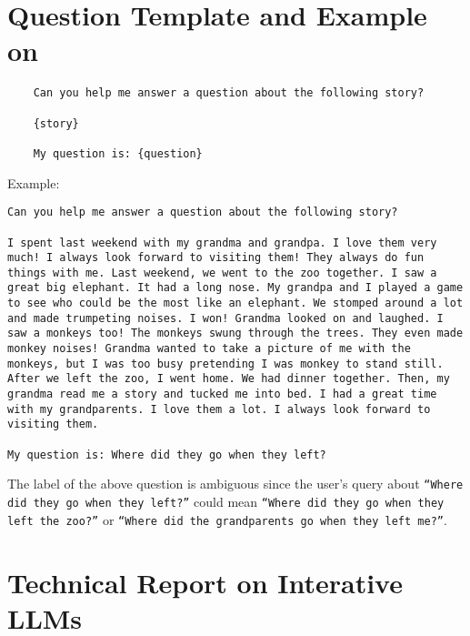 \section{Question Template and Example on \ambcoqa}
\label{app:abg_coqa}
\begin{lstlisting}
    Can you help me answer a question about the following story?
    
    {story}
    
    My question is: {question}
\end{lstlisting}

Example: 
\begin{lstlisting}
Can you help me answer a question about the following story?

I spent last weekend with my grandma and grandpa. I love them very much! I always look forward to visiting them! They always do fun things with me. Last weekend, we went to the zoo together. I saw a great big elephant. It had a long nose. My grandpa and I played a game to see who could be the most like an elephant. We stomped around a lot and made trumpeting noises. I won! Grandma looked on and laughed. I saw a monkeys too! The monkeys swung through the trees. They even made monkey noises! Grandma wanted to take a picture of me with the monkeys, but I was too busy pretending I was monkey to stand still. After we left the zoo, I went home. We had dinner together. Then, my grandma read me a story and tucked me into bed. I had a great time with my grandparents. I love them a lot. I always look forward to visiting them.

My question is: Where did they go when they left?
\end{lstlisting}

The label of the above question is ambiguous since the user's query about \texttt{``Where did they go when they left?''} could mean \texttt{``Where did they go when they left the zoo?''} or \texttt{``Where did the grandparents go when they left me?''}.

\section{Technical Report on Interative LLMs}
\label{app:train}

